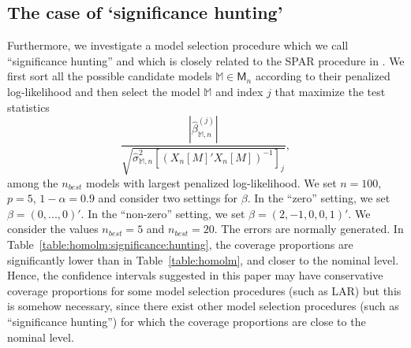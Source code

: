 \documentclass[preprint]{imsart}
\newcommand{\M}{\mathbb M}
\numberwithin{equation}{section}
\begin{document}
\begin{table}[h]
\begin{center}
\end{center}
\caption{Coverage proportion (cov.), median length (med.) and $90 \%$ quantile length (qua.) for the ``POSI'' and ``TG'' confidence intervals at nominal level $1-\alpha=0.9$. The design matrix is generated with independent (upper half of the table) or correlated (lower half) columns. The errors $u$ have normal (N), Laplace (L), uniform (U) or skewed normal (SN) distributions. For each setting, the ``POSI'' intervals correspond to the first row and the ``TG'' intervals correspond to the second row. The coverage proportions, median and quantile lengths are given for each of the three targets for the three first steps of the LAR algorithm. The last column provides the simultaneous coverage proportion of the three targets after step~3.}
\label{table:homolm}
\end{table}



\subsection{The case of `significance hunting'}

Furthermore, we investigate a model selection procedure which we call ``significance hunting'' and which is closely related to the SPAR procedure in \cite{Berk13}. We first sort all the possible candidate models $\mathbb{M}\in\mathsf M_n$ according to their penalized log-likelihood and then select the model $\M$ and index $j$ that maximize the test statistics
\[
\frac{
\left| \hat{\beta}^{(j)}_{\mathbb{M},n} \right|
}{
  \sqrt{\hat{\sigma}^2_{\mathbb{M},n} \left[\left( X_n[M]'X_n[M]  \right)^{-1}\right]_j}
},
\]
among the $n_{best}$ models with largest penalized log-likelihood.
We set $n=100$, $p=5$, $1-\alpha=0.9$ and consider two settings for $\beta$. In the ``zero'' setting, we set $\beta = (0,...,0)'$. In the ``non-zero'' setting, we set $\beta = (2,-1,0,0,1)'$. We consider the values $n_{best}=5$ and $n_{best} = 20$.
The errors are normally generated. In Table~\ref{table:homolm:significance:hunting}, the coverage proportions are significantly lower than in Table~\ref{table:homolm}, and closer to the nominal level. Hence, the confidence intervals suggested in this paper may have conservative coverage proportions for some model selection procedures (such as LAR) but this is somehow necessary, since there exist other model selection procedures (such as ``significance hunting'') for which the coverage proportions are close to the nominal level.
\end{document}
